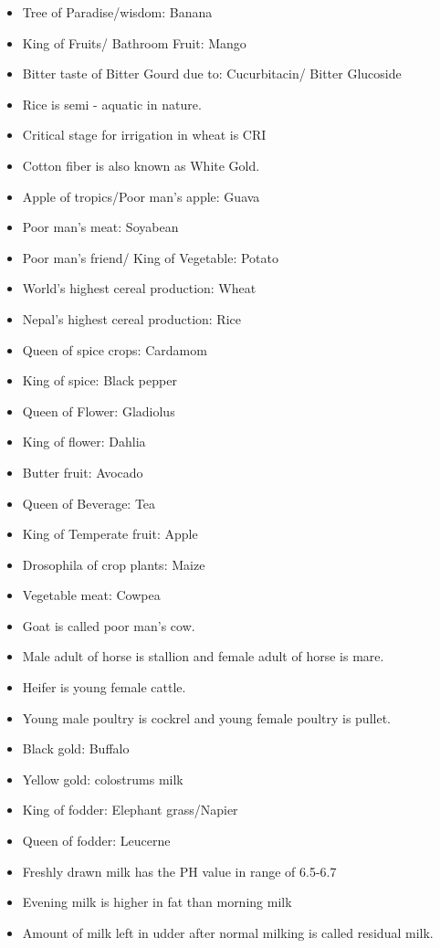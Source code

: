 \documentclass[
  openany]{book}
\begin{document}
\begin{itemize}
\item
  Tree of Paradise/wisdom: Banana
\item
  King of Fruits/ Bathroom Fruit: Mango
\item
  Bitter taste of Bitter Gourd due to: Cucurbitacin/ Bitter Glucoside
\item
  Rice is semi - aquatic in nature.
\item
  Critical stage for irrigation in wheat is CRI
\item
  Cotton fiber is also known as White Gold.
\item
  Apple of tropics/Poor man's apple: Guava
\item
  Poor man's meat: Soyabean
\item
  Poor man's friend/ King of Vegetable: Potato
\item
  World's highest cereal production: Wheat
\item
  Nepal's highest cereal production: Rice
\item
  Queen of spice crops: Cardamom
\item
  King of spice: Black pepper
\item
  Queen of Flower: Gladiolus
\item
  King of flower: Dahlia
\item
  Butter fruit: Avocado
\item
  Queen of Beverage: Tea
\item
  King of Temperate fruit: Apple
\item
  Drosophila of crop plants: Maize
\item
  Vegetable meat: Cowpea
\item
  Goat is called poor man's cow.
\item
  Male adult of horse is stallion and female adult of horse is mare.
\item
  Heifer is young female cattle.
\item
  Young male poultry is cockrel and young female poultry is pullet.
\item
  Black gold: Buffalo
\item
  Yellow gold: colostrums milk
\item
  King of fodder: Elephant grass/Napier
\item
  Queen of fodder: Leucerne
\item
  Freshly drawn milk has the PH value in range of 6.5-6.7
\item
  Evening milk is higher in fat than morning milk
\item
  Amount of milk left in udder after normal milking is called residual milk.

\end{itemize}
\end{document}
